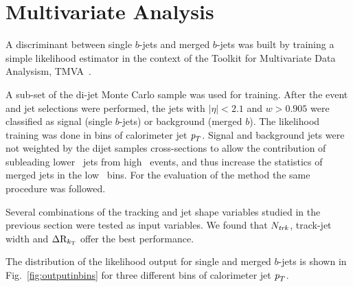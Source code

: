 \section{Multivariate Analysis}\label{sec:gbbTMVA}
A discriminant between single $b$-jets and merged $b$-jets was built by training a simple likelihood estimator in the context of the Toolkit for Multivariate Data Analysism, TMVA~\cite{Hocker:2007ht}.

A sub-set of the di-jet Monte Carlo sample was used for training. After the event and jet selections were performed, the jets with $|\eta| < 2.1$ and $w > 0.905$ were classified as signal (single $b$-jets) or background (merged $b$). %
The likelihood training was done in bins of calorimeter jet ${\emph{p}_{T}}$. %
Signal and background jets were not weighted by the dijet samples cross-sections to allow the contribution of subleading lower \pt\ jets from high \pt\ events, and thus increase the statistics of merged jets in the low \pt\ bins. For the evaluation of the method the same procedure was followed.

Several combinations of the tracking and jet shape variables studied in the previous section were tested as input variables. We found that $N_{\it trk}$, track-jet width and $\Delta {\rm R}_{k_{\rm T}}$ offer the best performance.

The distribution of the likelihood output for single and merged $b$-jets is shown in  Fig.~\ref{fig:outputinbins} for three different bins of calorimeter jet ${\emph{p}_{T}}$.

